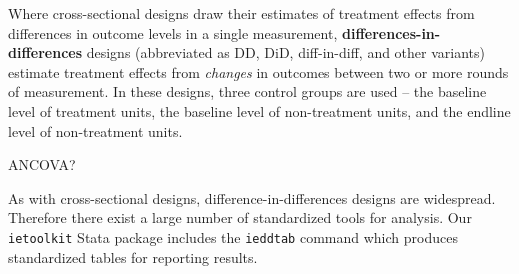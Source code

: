 Where cross-sectional designs draw their estimates of treatment effects
from differences in outcome levels in a single measurement,
\textbf{differences-in-differences}
designs (abbreviated as DD, DiD, diff-in-diff, and other variants)
estimate treatment effects from \textit{changes} in outcomes
between two or more rounds of measurement.
In these designs, three control groups are used –
the baseline level of treatment units,
the baseline level of non-treatment units,
and the endline level of non-treatment units.

ANCOVA?

As with cross-sectional designs, difference-in-differences designs are widespread.
Therefore there exist a large number of standardized tools for analysis.
Our \texttt{ietoolkit} Stata package includes the \texttt{ieddtab} command
which produces standardized tables for reporting results.


